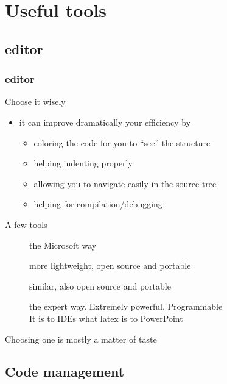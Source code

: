 \section[Tool]{Useful tools}

\subsection[Editor]{\cpp editor}

\begin{frame}[fragile]
  \frametitle{\cpp editor}
  \begin{block}{Choose it wisely}
    \begin{itemize}
    \item it can improve dramatically your efficiency by
      \begin{itemize}
      \item coloring the code for you to ``see'' the structure
      \item helping indenting properly
      \item allowing you to navigate easily in the source tree
      \item helping for compilation/debugging
      \end{itemize}
    \end{itemize}
  \end{block}
  \begin{block}{A few tools}
    \begin{description}
    \item[\href{http://www.microsoft.com/}{}]
      the Microsoft way
    \item[\href{https://code.visualstudio.com/}{}]
      more lightweight, open source and portable
    \item[\href{https://www.eclipse.org/}{}]
      similar, also open source and portable
    \item[\href{http://www.gnu.org/software/emacs/}{}]
      the expert way. Extremely powerful. Programmable \\
      It is to IDEs what latex is to PowerPoint
    \end{description}
    Choosing one is mostly a matter of taste
  \end{block}
\end{frame}

\subsection[VCS]{Code management}

